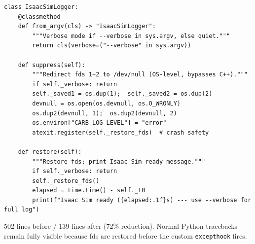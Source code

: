\documentclass[11pt,a4paper]{article}
\begin{document}
\begin{lstlisting}[caption={\texttt{project\_utils/log\_isaacsim.py} --- key methods}]
class IsaacSimLogger:
    @classmethod
    def from_argv(cls) -> "IsaacSimLogger":
        """Verbose mode if --verbose in sys.argv, else quiet."""
        return cls(verbose=("--verbose" in sys.argv))

    def suppress(self):
        """Redirect fds 1+2 to /dev/null (OS-level, bypasses C++)."""
        if self._verbose: return
        self._saved1 = os.dup(1);  self._saved2 = os.dup(2)
        devnull = os.open(os.devnull, os.O_WRONLY)
        os.dup2(devnull, 1);  os.dup2(devnull, 2)
        os.environ["CARB_LOG_LEVEL"] = "error"
        atexit.register(self._restore_fds)  # crash safety

    def restore(self):
        """Restore fds; print Isaac Sim ready message."""
        if self._verbose: return
        self._restore_fds()
        elapsed = time.time() - self._t0
        print(f"Isaac Sim ready ({elapsed:.1f}s) --- use --verbose for full log")
\end{lstlisting}

\begin{resultbox}
502 lines before / 139 lines after (72\% reduction). Normal Python tracebacks remain fully visible because fds are restored before the custom \texttt{excepthook} fires.
\end{resultbox}
\end{document}
